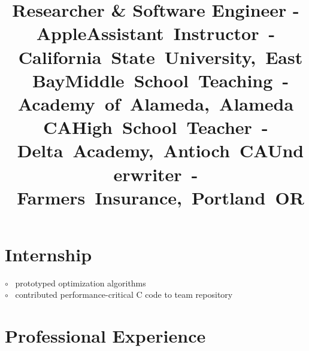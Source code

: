 \documentclass[12pt,margintitle,line]{res}
\newcommand{\CC}{C\nolinebreak\hspace{-.05em}\raisebox{.4ex}{\scriptsize\bf +}\nolinebreak\hspace{-.10em}\raisebox{.4ex}{\scriptsize\bf +} }
\def\CC{{C\nolinebreak[4]\hspace{-.05em}\raisebox{.4ex}{\scriptsize\bf ++}}}
\begin{document}
\begin{resume}


\vspace{-1.3cm}

\section{Internship}

\vspace{-0.5cm}
\title{Researcher \& Software Engineer - Apple}
\dates{}
\begin{position}
$\circ$ \ prototyped optimization algorithms \\
$\circ$ \ contributed performance-critical \CC \hspace{-0.02cm} code to team repository 
\end{position}



\vspace{-0.2cm}

\section{Professional Experience}

\vspace{-0.5cm}
\title{\mbox{Assistant Instructor - California State University, East Bay}}
\dates{}
\begin{position}
\end{position}


\vspace{-1.8cm}
\title{\mbox{Middle School Teaching - Academy of Alameda, Alameda CA}}
\dates{}
\begin{position}
\end{position}

\vspace{-1.8cm}
\title{\mbox{High School Teacher - Delta Academy, Antioch CA}}
\dates{}
\begin{position}
\end{position}

\vspace{-1.8cm}
\title{\mbox{Underwriter - Farmers Insurance, Portland OR}}
\dates{}
\begin{position}
\end{position}





\end{resume}
\end{document}
